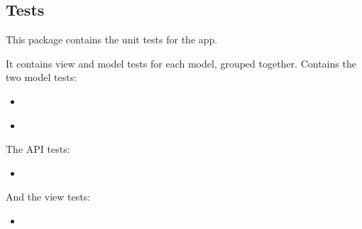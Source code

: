 \documentclass[letterpaper,10pt,english]{sphinxmanual}
\begin{document}
\subsection{Tests}
\label{papers:module-papers.tests}\label{papers:tests}
This package contains the unit tests for the {\hyperref[papers:module-papers]{}} app.

It contains view and model tests for each model, grouped together.
Contains the two model tests:
\begin{itemize}
\item {} 
{\hyperref[papers:papers.tests.PublicationModelTests]{}}

\item {} 
{\hyperref[papers:papers.tests.AuthorDetailsModelTests]{}}

\end{itemize}

The API tests:
\begin{itemize}
\item {} 
{\hyperref[papers:papers.tests.PublicationResourceTests]{}}

\end{itemize}

And the view tests:
\begin{itemize}
\item {} 
{\hyperref[papers:papers.tests.PublicationViewTests]{}}

\end{itemize}
\end{document}
